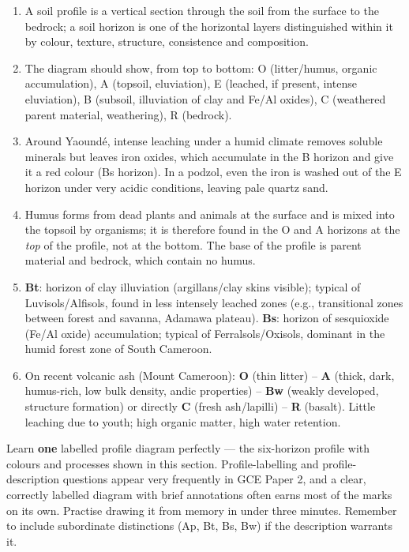 \documentclass[11pt]{article}
\begin{document}
\begin{corrige}[Exercise 1]
\begin{enumerate}
\item A soil profile is a vertical section through the soil from the surface to the bedrock; a soil horizon is one of the horizontal layers distinguished within it by colour, texture, structure, consistence and composition.
\item The diagram should show, from top to bottom: O (litter/humus, organic accumulation), A (topsoil, eluviation), E (leached, if present, intense eluviation), B (subsoil, illuviation of clay and Fe/Al oxides), C (weathered parent material, weathering), R (bedrock).
\item Around Yaoundé, intense leaching under a humid climate removes soluble minerals but leaves iron oxides, which accumulate in the B horizon and give it a red colour (Bs horizon). In a podzol, even the iron is washed out of the E horizon under very acidic conditions, leaving pale quartz sand.
\item Humus forms from dead plants and animals at the surface and is mixed into the topsoil by organisms; it is therefore found in the O and A horizons at the \emph{top} of the profile, not at the bottom. The base of the profile is parent material and bedrock, which contain no humus.
\item \textbf{Bt}: horizon of clay illuviation (argillans/clay skins visible); typical of Luvisols/Alfisols, found in less intensely leached zones (e.g., transitional zones between forest and savanna, Adamawa plateau). \textbf{Bs}: horizon of sesquioxide (Fe/Al oxide) accumulation; typical of Ferralsols/Oxisols, dominant in the humid forest zone of South Cameroon.
\item On recent volcanic ash (Mount Cameroon): \textbf{O} (thin litter) -- \textbf{A} (thick, dark, humus-rich, low bulk density, andic properties) -- \textbf{Bw} (weakly developed, structure formation) or directly \textbf{C} (fresh ash/lapilli) -- \textbf{R} (basalt). Little leaching due to youth; high organic matter, high water retention.
\end{enumerate}
\end{corrige}

\begin{attention}
Learn \textbf{one} labelled profile diagram perfectly --- the six-horizon profile with colours and processes shown in this section. Profile-labelling and profile-description questions appear very frequently in GCE Paper 2, and a clear, correctly labelled diagram with brief annotations often earns most of the marks on its own. Practise drawing it from memory in under three minutes. Remember to include subordinate distinctions (Ap, Bt, Bs, Bw) if the description warrants it.
\end{attention}
\end{document}
